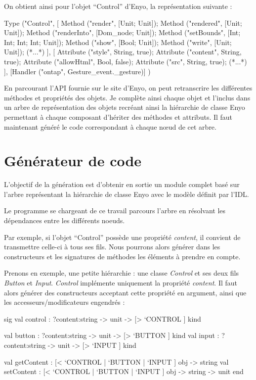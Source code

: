 \documentclass[11pt,a4paper]{report}
\begin{document}
On obtient ainsi pour l'objet ``Control'' d'Enyo, la représentation suivante :

\begin{OCaml}
Type ("Control",
      [
	Method ("render", [Unit; Unit]);
	Method ("rendered", [Unit; Unit]);
	Method ("renderInto", [Dom_node; Unit]);
	Method ("setBounds", [Int; Int; Int; Int; Unit]);
	Method ("show", [Bool; Unit]);
	Method ("write", [Unit; Unit]);
        (*...*)
      ],
      [
	Attribute ("style", String, true);
	Attribute ("content", String, true);
	Attribute ("allowHtml", Bool, false);
	Attribute ("src", String, true);
        (*...*)
      ],
      [Handler ("ontap", Gesture_event._gesture)]
)
\end{OCaml}

En parcourant l'API fournie sur le site d'Enyo, on peut retranscrire les différentes méthodes 
et propriétés des objets.
Je complète ainsi chaque objet et l'inclus dans un arbre de représentation des objets recréant 
ainsi la hiérarchie de classe Enyo permettant à chaque composant d'hériter des méthodes et attributs.
Il faut maintenant généré le code correspondant à chaque n\oe{}ud de cet arbre.

\section{Générateur de code}

L'objectif de la génération est d'obtenir en sortie un module complet basé sur l'arbre  
représentant la hiérarchie de classe Enyo avec le modèle définit par l'IDL.

Le programme se chargeant de ce travail parcours l'arbre en résolvant les dépendances
entre les différents noeuds.

Par exemple, si l'objet ``Control'' possède une propriété \emph{content}, il convient
de transmettre celle-ci à tous ses fils.
Nous pourrons alors générer dans les constructeurs et les signatures de méthodes
les éléments à prendre en compte.

Prenons en exemple, une petite hiérarchie : une classe \emph{Control} et ses deux fils \emph{Button} et \emph{Input}. 
\emph{Control} implémente uniquement la propriété \emph{content}. Il faut alors générer des constructeurs
acceptant cette propriété en argument, ainsi que les accesseurs/modificateurs engendrés :

\begin{OCaml}
sig
  val control : ?content:string -> unit -> [> `CONTROL ] kind

  val button : ?content:string -> unit -> [> `BUTTON ] kind
  val input : ?content:string -> unit -> [> `INPUT ] kind

  val getContent : [< `CONTROL | `BUTTON | `INPUT ] obj -> string
  val setContent : [< `CONTROL | `BUTTON | `INPUT ] obj -> string -> unit
end
\end{OCaml}
\end{document}
